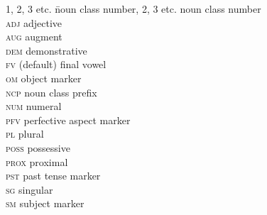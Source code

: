 \documentclass[output=paper]{langscibook}
\begin{document}
\begin{multicols}{2}
\begin{tabbing}
1, 2, 3 etc. \= noun class number, 2, 3 etc. \> noun class number\\
\textsc{adj} \> adjective\\
\textsc{aug} \> augment\\
\textsc{dem} \> demonstrative\\
\textsc{fv} \> (default) final vowel\\
\textsc{om} \> object marker\\
\textsc{ncp} \> noun class prefix\\
\textsc{num} \> numeral\\
\textsc{pfv} \> perfective aspect marker\\
\textsc{pl} \> plural\\
\textsc{poss} \> possessive\\
\textsc{prox} \> proximal\\
\textsc{pst} \> past tense marker\\
\textsc{sg} \> singular\\
\textsc{sm} \> subject marker\\  
\end{tabbing}
\end{multicols}



\printbibliography[heading=subbibliography,notkeyword=this]
\end{document}
